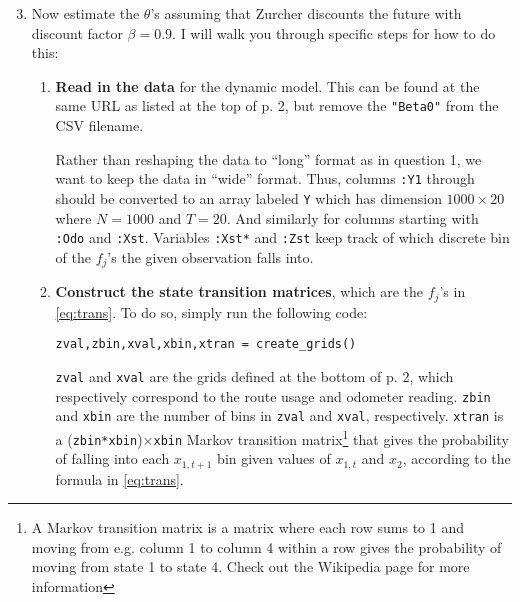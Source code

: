 \documentclass[12pt,english]{article}
\begin{document}
\begin{enumerate}
\setcounter{enumi}{2}
\item Now estimate the $\theta$'s assuming that Zurcher discounts the future with discount factor $\beta = 0.9$. I will walk you through specific steps for how to do this:
    \begin{enumerate}
        \item \textbf{Read in the data} for the dynamic model. This can be found at the same URL as listed at the top of p. 2, but remove the \texttt{"Beta0"} from the CSV filename.
        
        Rather than reshaping the data to ``long'' format as in question 1, we want to keep the data in ``wide'' format. Thus, columns \texttt{:Y1} through  should be converted to an array labeled \texttt{Y} which has dimension $1000 \times 20$ where $N = 1000$ and $T = 20$. And similarly for columns starting with \texttt{:Odo} and \texttt{:Xst}. Variables \texttt{:Xst*} and \texttt{:Zst} keep track of which discrete bin of the $f_j$'s the given observation falls into.
        
        \item \textbf{Construct the state transition matrices}, which are the $f_j$'s in \eqref{eq:trans}. To do so, simply run the following code:
        
        \begin{verbatim}
zval,zbin,xval,xbin,xtran = create_grids()
        \end{verbatim}
        
        \texttt{zval} and \texttt{xval} are the grids defined at the bottom of p. 2, which respectively correspond to the route usage and odometer reading. \texttt{zbin} and \texttt{xbin} are the number of bins in \texttt{zval} and \texttt{xval}, respectively. \texttt{xtran} is a (\texttt{zbin*xbin})$\times$\texttt{xbin} Markov transition matrix\footnote{A Markov transition matrix is a matrix where each row sums to 1 and moving from e.g. column 1 to column 4 within a row gives the probability of moving from state 1 to state 4. Check out the Wikipedia page for more information} that gives the probability of falling into each $x_{1,t+1}$ bin given values of $x_{1,t}$ and $x_2$, according to the formula in \eqref{eq:trans}.
        

\end{enumerate}
\end{enumerate}
\end{document}
